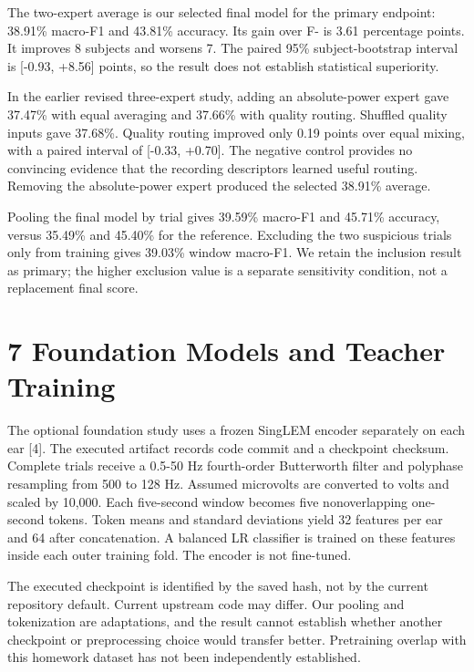 \documentclass[10pt,a4paper]{article}
\begin{document}
The two-expert average is our selected final model for the primary endpoint: 38.91\% macro-F1 and 43.81\% accuracy. Its gain over F- is 3.61 percentage points. It improves 8 subjects and worsens 7. The paired 95\% subject-bootstrap interval is [-0.93, +8.56] points, so the result does not establish statistical superiority.


In the earlier revised three-expert study, adding an absolute-power expert gave 37.47\% with equal averaging and 37.66\% with quality routing. Shuffled quality inputs gave 37.68\%. Quality routing improved only 0.19 points over equal mixing, with a paired interval of [-0.33, +0.70]. The negative control provides no convincing evidence that the recording descriptors learned useful routing. Removing the absolute-power expert produced the selected 38.91\% average.


Pooling the final model by trial gives 39.59\% macro-F1 and 45.71\% accuracy, versus 35.49\% and 45.40\% for the reference. Excluding the two suspicious trials only from training gives 39.03\% window macro-F1. We retain the inclusion result as primary; the higher exclusion value is a separate sensitivity condition, not a replacement final score.


\section*{7 Foundation Models and Teacher Training}

The optional foundation study uses a frozen SingLEM encoder separately on each ear [4]. The executed artifact records code commit  and a checkpoint checksum. Complete trials receive a 0.5-50 Hz fourth-order Butterworth filter and polyphase resampling from 500 to 128 Hz. Assumed microvolts are converted to volts and scaled by 10,000. Each five-second window becomes five nonoverlapping one-second tokens. Token means and standard deviations yield 32 features per ear and 64 after concatenation. A balanced LR classifier is trained on these features inside each outer training fold. The encoder is not fine-tuned.


The executed checkpoint is identified by the saved hash, not by the current repository default. Current upstream code may differ. Our pooling and tokenization are adaptations, and the result cannot establish whether another checkpoint or preprocessing choice would transfer better. Pretraining overlap with this homework dataset has not been independently established.
\end{document}
